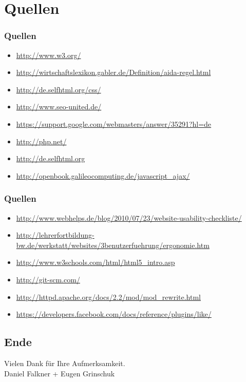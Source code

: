 \documentclass[xcolor=dvipsnames]{beamer}
\newcommand*{\Author}{Daniel Falkner + Eugen Grinschuk} %
\begin{document}
\section*{Quellen}
\begin{frame} %
  \frametitle{Quellen} %
 	\begin{itemize}
		\item \url{http://www.w3.org/}
		\item \url{http://wirtschaftslexikon.gabler.de/Definition/aida-regel.html}
		\item \url{http://de.selfhtml.org/css/}
		\item \url{http://www.seo-united.de/}
		\item \url{https://support.google.com/webmasters/answer/35291?hl=de}		\item \url{http://php.net/}
 		\item \url{http://de.selfhtml.org}
		\item \url{http://openbook.galileocomputing.de/javascript_ajax/}
	\end{itemize}
\end{frame}

\begin{frame} %
  \frametitle{Quellen} %
 	\begin{itemize}
 		\item  \url{http://www.webhelps.de/blog/2010/07/23/website-usability-checkliste/}
		\item \url{http://lehrerfortbildung-bw.de/werkstatt/websites/3benutzerfuehrung/ergonomie.htm}
		\item \url{ http://www.w3schools.com/html/html5_intro.asp}
		\item \url{http://git-scm.com/}
		\item \url{http://httpd.apache.org/docs/2.2/mod/mod_rewrite.html}
		\item \url{https://developers.facebook.com/docs/reference/plugins/like/}
	\end{itemize}
\end{frame}

\subsection*{Ende}
\begin{frame}
	\begin{block}{}	
		\begin{center}
			Vielen Dank für Ihre Aufmerksamkeit. \\
			\Author{}
		\end{center}	
	\end{block}
\end{frame}
\end{document}
